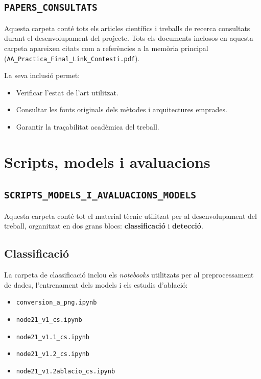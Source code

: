 \documentclass[11pt,a4paper]{article}
\begin{document}
\subsection{\texttt{PAPERS\_CONSULTATS}}

Aquesta carpeta conté tots els articles científics i treballs de recerca
consultats durant el desenvolupament del projecte.  
Tots els documents inclosos en aquesta carpeta apareixen citats com a referències
a la memòria principal (\texttt{AA\_Practica\_Final\_Link\_Contesti.pdf}).

La seva inclusió permet:
\begin{itemize}
    \item Verificar l’estat de l’art utilitzat.
    \item Consultar les fonts originals dels mètodes i arquitectures emprades.
    \item Garantir la traçabilitat acadèmica del treball.
\end{itemize}

\section{Scripts, models i avaluacions}

\subsection{\texttt{SCRIPTS\_MODELS\_I\_AVALUACIONS\_MODELS}}

Aquesta carpeta conté tot el material tècnic utilitzat per al desenvolupament del
treball, organitzat en dos grans blocs: \textbf{classificació} i \textbf{detecció}.

\subsection{Classificació}

La carpeta de classificació inclou els \textit{notebooks} utilitzats per al
preprocessament de dades, l’entrenament dels models i els estudis d’ablació:

\begin{itemize}[leftmargin=1.5cm]
    \item \texttt{conversion\_a\_png.ipynb}
    \item \texttt{node21\_v1\_cs.ipynb}
    \item \texttt{node21\_v1.1\_cs.ipynb}
    \item \texttt{node21\_v1.2\_cs.ipynb}
    \item \texttt{node21\_v1.2ablacio\_cs.ipynb}
\end{itemize}
\end{document}
